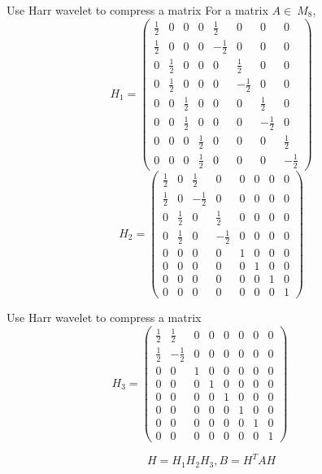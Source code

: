 \documentclass{beamer}
\begin{document}
\begin{frame}{Use Harr wavelet to compress a matrix}
For a matrix $A \in\ M_8$,
\small
{
\[
H_1 = \left(\begin{array}{cccccccc}
\frac{1}{2} & 0 & 0 & 0 & \frac{1}{2} & 0& 0& 0\\
\frac{1}{2} & 0 & 0 & 0 & -\frac{1}{2} & 0& 0& 0 \\
0 & \frac{1}{2} & 0 & 0 & 0 & \frac{1}{2}& 0& 0 \\
0 & \frac{1}{2} & 0 & 0 & 0 & -\frac{1}{2}& 0& 0 \\
0&0 & \frac{1}{2} & 0 & 0 & 0 & \frac{1}{2}& 0 \\
0&0 & \frac{1}{2} & 0 & 0 & 0 & -\frac{1}{2}& 0 \\
0&0&0 & \frac{1}{2} & 0 & 0 & 0 & \frac{1}{2}\\
0&0&0 & \frac{1}{2} & 0 & 0 & 0 & -\frac{1}{2}
\end{array}\right)
\]
\[
H_2=\left(\begin{array}{cccccccc}
\frac{1}{2} & 0 & \frac{1}{2} & 0 & 0 & 0& 0& 0\\
\frac{1}{2} & 0 & -\frac{1}{2} & 0 & 0 & 0& 0& 0 \\
0 & \frac{1}{2} & 0 & \frac{1}{2} & 0 & 0& 0& 0 \\
0 & \frac{1}{2} & 0 & -\frac{1}{2} & 0 & 0& 0& 0 \\
0&0 & 0 & 0 & 1 & 0 & 0& 0 \\
0&0 & 0 & 0 & 0 & 1 & 0& 0 \\
0&0&0 & 0 & 0 & 0 & 1 & 0\\
0&0&0 & 0 & 0 & 0 & 0 & 1
\end{array}\right)
\]
}
\end{frame}

\begin{frame}{Use Harr wavelet to compress a matrix}
\[
H_3 = \left(\begin{array}{cccccccc}
\frac{1}{2} & \frac{1}{2} & 0 & 0 & 0 & 0& 0& 0\\
\frac{1}{2} & -\frac{1}{2} & 0 & 0 & 0 & 0& 0& 0 \\
0 & 0 & 1 & 0 & 0 & 0 & 0 & 0 \\
0 & 0 & 0 & 1 & 0 & 0 & 0 & 0 \\
0 & 0 & 0 & 0 & 1 & 0 & 0 & 0 \\
0 & 0 & 0 & 0 & 0 & 1 & 0 & 0 \\
0 & 0 & 0 & 0 & 0 & 0 & 1 & 0 \\
0 & 0 & 0 & 0 & 0 & 0 & 0 & 1
\end{array}\right)
\quad \quad 
\]

\medskip \medskip

\[
H = H_1H_2H_3, B = H^TAH
\]

\end{frame}
\end{document}
